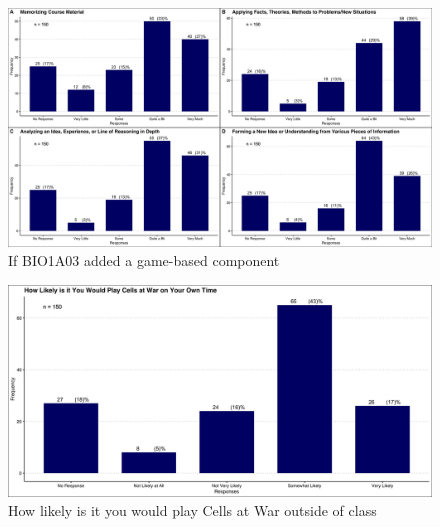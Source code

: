 \documentclass{article}
\begin{document}
\begin{figure}[H]
	\includegraphics[width=\textwidth]{figures_4f06/ifbio1a03_added_gblcomponent.jpg}
	\caption{If BIO1A03 added a game-based component}
	\label{fig:6}
\end{figure}

\begin{figure}[H]
	\includegraphics[width=\textwidth]{figures_4f06/how_likely_you_would_play_cellsatwar.jpg}
	\caption{How likely is it you would play Cells at War outside of class}
	\label{fig:7}
\end{figure}
\end{document}
